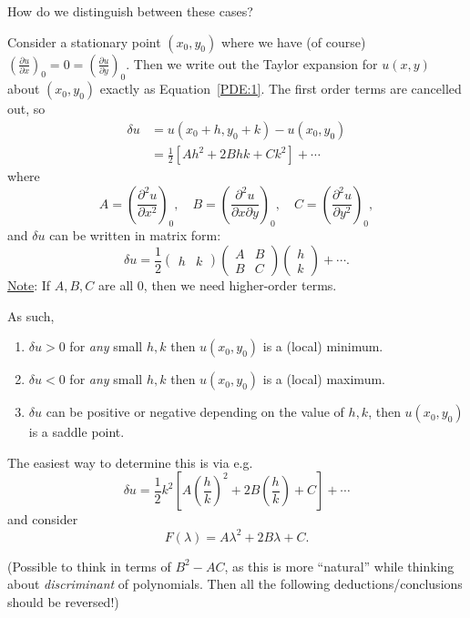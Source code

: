 \documentclass[12pt]{report}
\theoremstyle{definition}
\begin{document}
How do we distinguish between these cases?

Consider a stationary point $(x_0,y_0)$ where we have (of course)
${\left(\frac{\partial u}{\partial x} \right)}_{0} = 0 = {\left(\frac{\partial u}{\partial y} \right)}_{0}$.
Then we write out the Taylor expansion for $u(x,y)$ about $(x_0, y_0)$
exactly as Equation~\eqref{PDE:1}. The first order terms are cancelled out, so\[
    \begin{align*}
        \delta u & = u(x_0 + h, y_0 + k) - u(x_0, y_0) \\
                 & = \frac{1}{2}\left[Ah^{2} + 2Bhk + Ck^{2}\right] + \cdots
    \end{align*}
\]where\[
    A = {\left(\frac{\partial^{2}u}{\partial x^{2}} \right)}_{0}, \quad
    B = {\left(\frac{\partial^{2}u}{\partial x \partial y} \right)}_{0}, \quad
    C = {\left(\frac{\partial^{2}u}{\partial y^{2}} \right)}_{0},
\]and $\delta u$ can be written in matrix form:\[
    \delta u = \frac{1}{2}\begin{pmatrix}
        h & k
    \end{pmatrix} \begin{pmatrix}
        A & B \\
        B & C
    \end{pmatrix} \begin{pmatrix}
            h \\
            k
    \end{pmatrix} + \cdots.
\]
\underline{Note}: If $A, B, C$ are all $0$, then we need higher-order terms.

\bigskip
As such,
\begin{enumerate}[label = (\roman*)]
    \item $\delta u > 0$ for \emph{any} small $h,k$ then $u(x_0,y_0)$ is a (local) minimum.
    \item $\delta u < 0$ for \emph{any} small $h,k$ then $u(x_0, y_0)$ is a (local) maximum.
    \item $\delta u$ can be positive or negative depending on the value of $h, k$,
        then $u(x_0,y_0)$ is a saddle point.
\end{enumerate}

The easiest way to determine this is via e.g.\[
    \delta u = \frac{1}{2}k^{2}\left[A{\left(\frac{h}{k}\right)}^{2} 
    + 2B\left(\frac{h}{k}\right) + C\right] + \cdots
\]and consider\[
F(\lambda) = A\lambda^{2} + 2B\lambda + C.
\]

(Possible to think in terms of $B^{2}-AC$, as this is more ``natural''
while thinking about \emph{discriminant} of polynomials. Then
all the following deductions/conclusions should be reversed!)
\end{document}
